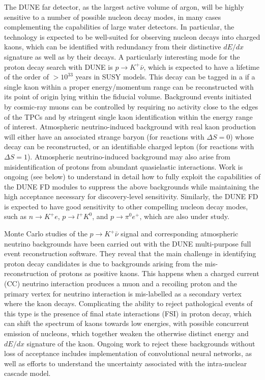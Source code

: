 The DUNE far detector, as the largest active volume of argon, 
will be highly sensitive to a number of possible nucleon decay modes, 
in many cases complementing the capabilities of large water detectors.  
In particular, the \lartpc technology is expected to be well-suited for observing 
nucleon decays into charged kaons, which can be identified with redundancy 
from their distinctive $dE/dx$ signature as well as by their decays.
A particularly interesting mode for the proton decay search with DUNE is 
$p\to K^+ \bar{\nu}$, which is expected to have a lifetime of the order of 
$>10^{33}$ years in SUSY models. This decay can be tagged in a \lartpc if a 
single kaon within a proper energy/momentum range can be reconstructed with 
its point of origin lying within the fiducial volume. 
Background events initiated by cosmic-ray muons can be controlled  by requiring 
no activity close to the edges of the TPCs and by stringent single kaon identification 
within the energy range of interest. 
Atmospheric neutrino-induced background with real kaon production will either have an 
associated strange baryon (for reactions with $\Delta S = 0$) whose decay can be 
reconstructed, or an identifiable charged lepton (for reactions with $\Delta S = 1$). 
Atmospheric neutrino-induced background may also arise from misidentification of protons 
from abundant quasielastic interactions.  Work is ongoing (see below) to understand 
in detail how to fully exploit the capabilities of the DUNE \lartpc FD modules to suppress the above 
backgrounds while maintaining the high acceptance necessary for discovery-level sensitivity.
Similarly, the DUNE FD is expected to have good sensitivity to other compelling 
nucleon decay modes, 
such as $n\to K^+ e$, $p\to l^+ K^0$, and $p\to \pi^0 e^+$, which are also under study. 

Monte Carlo studies of the $p\to K^+ \bar{\nu}$ signal and corresponding atmospheric neutrino backgrounds have been carried out with the DUNE multi-purpose full event reconstruction software.  They reveal that the main challenge in identifying proton decay candidates is due to backgrounds arising from the mis-reconstruction of protons as positive kaons. This happens when a charged current (CC) neutrino interaction produces a muon and a recoiling proton and the primary vertex for neutrino interaction is mis-labelled as a secondary vertex where the kaon decays.  Complicating the ability to reject pathological events of this type is the presence of final state interactions (FSI) in proton decay, which can shift the spectrum of kaons towards low energies, with possible concurrent emission of nucleons, which together weaken the otherwise distinct energy and $dE/dx$ signature of the kaon. Ongoing work to reject these backgrounds without loss of acceptance includes implementation of convolutional neural networks, as well as efforts to understand the uncertainty associated with the intra-nuclear cascade model. 

